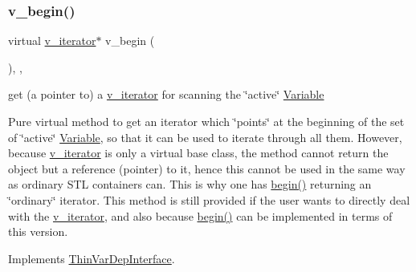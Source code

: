 \subsubsection{\texorpdfstring{v\+\_\+begin()}{v\_begin()}\hspace{0.1cm}{\footnotesize\ttfamily [1/2]}}
{\footnotesize\ttfamily virtual \mbox{\hyperlink{class_s_m_spp__di__unipi__it_1_1_one_var_constraint_1_1v__iterator}{v\+\_\+iterator}}$\ast$ v\+\_\+begin (\begin{DoxyParamCaption}\item[{void}]{ }\end{DoxyParamCaption})\hspace{0.3cm}{\ttfamily [inline]}, {\ttfamily [override]}, {\ttfamily [virtual]}}



get (a pointer to) a \mbox{\hyperlink{class_s_m_spp__di__unipi__it_1_1_one_var_constraint_1_1v__iterator}{v\+\_\+iterator}} for scanning the \char`\"{}active\char`\"{} \mbox{\hyperlink{class_s_m_spp__di__unipi__it_1_1_variable}{Variable}} 

Pure virtual method to get an iterator which \char`\"{}points\char`\"{} at the beginning of the set of \char`\"{}active\char`\"{} \mbox{\hyperlink{class_s_m_spp__di__unipi__it_1_1_variable}{Variable}}, so that it can be used to iterate through all them. However, because \mbox{\hyperlink{class_s_m_spp__di__unipi__it_1_1_one_var_constraint_1_1v__iterator}{v\+\_\+iterator}} is only a virtual base class, the method cannot return the object but a reference (pointer) to it, hence this cannot be used in the same way as ordinary S\+TL containers can. This is why one has \mbox{\hyperlink{group___thin_var_dep_interface___c_l_a_s_s_e_s_ga79162df6cbf36b4997db545dc30969e2}{begin()}} returning an \char`\"{}ordinary\char`\"{} iterator. This method is still provided if the user wants to directly deal with the \mbox{\hyperlink{class_s_m_spp__di__unipi__it_1_1_one_var_constraint_1_1v__iterator}{v\+\_\+iterator}}, and also because \mbox{\hyperlink{group___thin_var_dep_interface___c_l_a_s_s_e_s_ga79162df6cbf36b4997db545dc30969e2}{begin()}} can be implemented in terms of this version. 

Implements \mbox{\hyperlink{group___thin_var_dep_interface___c_l_a_s_s_e_s_ga645ab1f1a40dea7fdcef536081c78613}{Thin\+Var\+Dep\+Interface}}.

\mbox{\label{class_s_m_spp__di__unipi__it_1_1_one_var_constraint_a997de10fbae309ac6e357d7ad96a8052}} 

